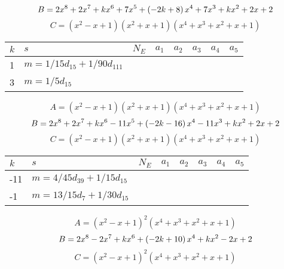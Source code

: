 \documentclass{amsart}
\begin{document}
$$B=2\*x^8
 + 2\*x^7
 + k\*x^6
 + 7\*x^5
 + \left(-2\*k
 + 8\right) \*x^4
 + 7\*x^3
 + k\*x^2
 + 2\*x
 + 2$$
$$C=(x^2
 - x
 + 1)(x^2
 + x
 + 1)(x^4
 + x^3
 + x^2
 + x
 + 1)$$
\begin{longtable}{|l|l|l|lllll|}
\hline
$k$ & $s$ & $N_E$ & $a_1$ & $a_2$ & $a_3$ & $a_4$ & $a_5$\\
\hline
1&$m=1/15d_{15}+1/90d_{111}$&&\multicolumn{5}{c|}{}\\
3&$m=1/5d_{15}$&&\multicolumn{5}{c|}{}\\
\hline
\end{longtable}
$$A=(x^2
 - x
 + 1)(x^2
 + x
 + 1)(x^4
 + x^3
 + x^2
 + x
 + 1)$$
$$B=2\*x^8
 + 2\*x^7
 + k\*x^6
 - 11\*x^5
 + \left(-2\*k
 - 16\right) \*x^4
 - 11\*x^3
 + k\*x^2
 + 2\*x
 + 2$$
$$C=(x^2
 - x
 + 1)(x^2
 + x
 + 1)(x^4
 + x^3
 + x^2
 + x
 + 1)$$
\begin{longtable}{|l|l|l|lllll|}
\hline
$k$ & $s$ & $N_E$ & $a_1$ & $a_2$ & $a_3$ & $a_4$ & $a_5$\\
\hline
-11&$m=4/45d_{39}+1/15d_{15}$&&\multicolumn{5}{c|}{}\\
-1&$m=13/15d_{7}+1/30d_{15}$&&\multicolumn{5}{c|}{}\\
\hline
\end{longtable}
$$A=(x^2
 - x
 + 1)^{2}(x^4
 + x^3
 + x^2
 + x
 + 1)$$
$$B=2\*x^8
 - 2\*x^7
 + k\*x^6
 + \left(-2\*k
 + 10\right) \*x^4
 + k\*x^2
 - 2\*x
 + 2$$
$$C=(x^2
 - x
 + 1)^{2}(x^4
 + x^3
 + x^2
 + x
 + 1)$$
\end{document}
